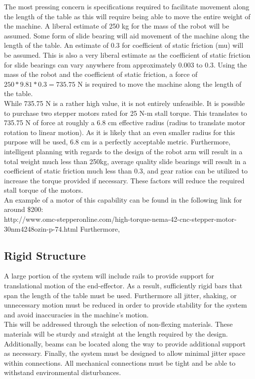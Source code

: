 \documentclass[titlepage]{article}
\begin{document}
The most pressing concern is specifications required to facilitate movement along the length of the table as this will require being able to move the entire weight of the machine.  A liberal estimate of 250 kg for the mass of the robot will be assumed. Some form of slide bearing will aid movement of the machine along the length of the table. An estimate of 0.3 for coefficient of static friction (mu) will be assumed. This is also a very liberal estimate as the coefficient of static friction for slide bearings can vary anywhere from approximately 0.003 to 0.3. Using the mass of the robot and the coefficient of static friction, a force of $250*9.81*0.3 = 735.75$ N is required to move the machine along the length of the table.\\

While 735.75 N is a rather high value, it is not entirely unfeasible. It is possible to purchase two stepper motors rated for 25 N-m stall torque. This translates to 735.75 N of force at roughly a 6.8 cm effective radius (radius to translate motor rotation to linear motion). As it is likely that an even smaller radius for this purpose will be used, 6.8 cm is a perfectly acceptable metric. Furthermore, intelligent planning with regards to the design of the robot arm will result in a total weight much less than 250kg, average quality slide bearings will result in a coefficient of static friction much less than 0.3, and gear ratios can be utilized to increase the torque provided if necessary. These factors will reduce the required stall torque of the motors.\\

An example of a motor of this capability can be found in the following link for around \$200:\\
http://www.omc-stepperonline.com/high-torque-nema-42-cnc-stepper-motor-30nm4248ozin-p-74.html
Furthermore, 
\subsection{Rigid Structure}
A large portion of the system will include rails to provide support for translational motion of the end-effector. As a result, sufficiently rigid bars that span the length of the table must be used. Furthermore all jitter, shaking, or unnecessary motion must be reduced in order to provide stability for the system and avoid inaccuracies in the machine's motion.\\

This will be addressed through the selection of non-flexing materials. These materials will be sturdy and straight at the length required by the design. Additionally, beams can be located along the way to provide additional support as necessary. Finally, the system must be designed to allow minimal jitter space within connections. All mechanical connections must be tight and be able to withstand environmental disturbances. 
\end{document}
